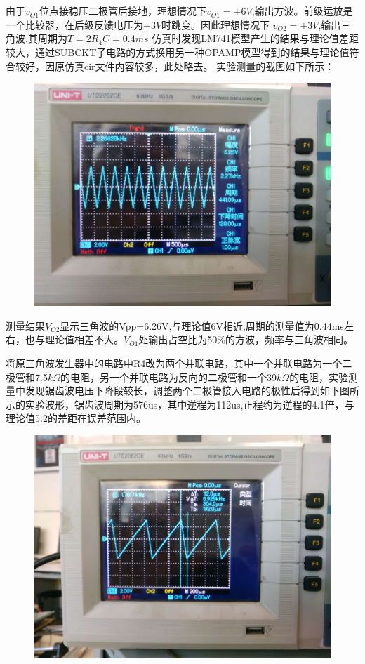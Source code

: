 ﻿\documentclass[10.5pt]{ctexart}
\begin{document}
\section{\textbf{}}
由于$v_{O1}$位点接稳压二极管后接地，理想情况下$v_{O1}=\pm6V$,输出方波。前级运放是一个比较器，在后级反馈电压为$\pm3V$时跳变。因此理想情况下
$v_{O2}=\pm3V$,输出三角波,其周期为$T=2R_4 C=0.4ms$
仿真时发现LM741模型产生的结果与理论值差距较大，通过SUBCKT子电路的方式换用另一种OPAMP模型得到的结果与理论值符合较好，因原仿真cir文件内容较多，此处略去。
实验测量的截图如下所示：
\newpage
\begin{figure}[!ht]
\centering
\includegraphics[width=400pt]{IMG_20161222_085444.jpg}
\end{figure}
测量结果$V_{O2}$显示三角波的Vpp=6.26V,与理论值6V相近,周期的测量值为0.44ms左右，也与理论值相差不大。$V_{O1}$处输出占空比为50\%的方波，频率与三角波相同。

将原三角波发生器中的电路中R4改为两个并联电路，其中一个并联电路为一个二极管和7.5$k\Omega$的电阻，另一个并联电路为反向的二极管和一个39$k\Omega$的电阻，实验测量中发现锯齿波电压下降段较长，调整两个二极管接入电路的极性后得到如下图所示的实验波形，锯齿波周期为576us，其中逆程为112us,正程约为逆程的4.1倍，与理论值5.2的差距在误差范围内。
\newpage
\begin{figure}[!ht]
\centering
\includegraphics[width=400pt]{IMG_20161222_091521.jpg}
\end{figure}
\end{document}
